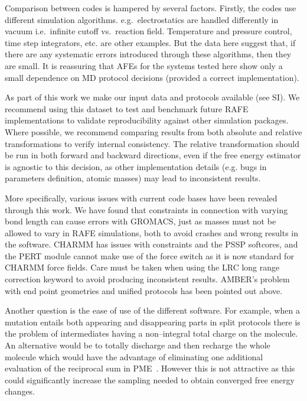 \documentclass[journal=jctcce,manuscript=article]{achemso}
\begin{document}
Comparison between codes is hampered by several factors.  Firstly, the codes use different simulation algorithms.  e.g.\
electrostatics are handled differently in vacuum i.e.\ infinite cutoff vs.\
reaction field.  Temperature and pressure control, time step integrators, etc. are other examples.  But the data here suggest that, if there are any systematic errors introduced through these algorithms, then they are small.  It is reassuring that AFEs for the systems tested here show only a small dependence on MD protocol decisions (provided a correct implementation).

As part of this work we make our input data and protocols available (see SI).  We recommend using this dataset to test and benchmark future RAFE implementations to validate reproducibility against other simulation packages.
Where possible, we recommend comparing results from both absolute and relative transformations to verify internal consistency.
The relative transformation should be run in both forward and backward directions, even if the free energy estimator is agnostic to this decision, as other implementation details (e.g. bugs in parameters definition, atomic masses) may lead to inconsistent results.

More specifically, various issues with current code bases have been revealed through this work.
We have found that constraints in connection with varying bond length can cause errors with GROMACS, just as masses must not be allowed to vary in RAFE simulations, both to avoid crashes and wrong results in the
software.  CHARMM has issues with constraints and the PSSP softcores, and the PERT module cannot make use of the force switch as it is now standard for CHARMM force fields. Care must be taken when using the LRC long range correction keyword to avoid producing inconsistent results.  AMBER's problem with end point geometries and unified protocols has been pointed out above.

Another question is the ease of use of the different software.  For example, when a mutation entails both appearing and disappearing parts in split
protocols there is the problem of intermediates having a non--integral total
charge on the molecule.  An alternative would be to totally discharge and then
recharge the whole molecule which
would have the advantage of eliminating one additional evaluation of the reciprocal sum in PME~\cite{doi:10.1021/ct400340s}.
 However this is not attractive as this could significantly increase the sampling needed to obtain converged free energy changes.
\end{document}
